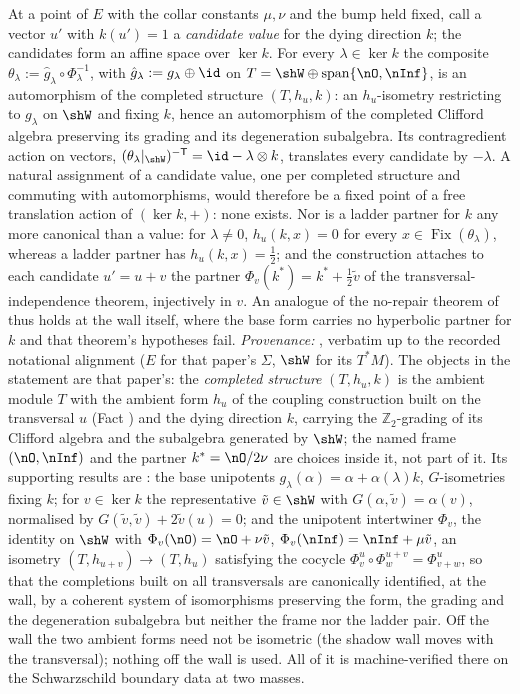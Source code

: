 At a point of $E$ with the collar constants $\mu, \nu$ and the bump held fixed, call a vector $u'$ with $k(u') = 1$ a \emph{candidate value} for the dying direction $k$; the candidates form an affine space over $\ker k$. For every $\lambda \in \ker k$ the composite $\theta_\lambda := \hat g_\lambda \circ \Phi_\lambda^{-1}$, with $\hat g_\lambda := g_\lambda \oplus \id$ on $T = \shW \oplus \operatorname{span}\{\nO, \nInf\}$, is an automorphism of the completed structure $(T, h_u, k)$: an $h_u$-isometry restricting to $g_\lambda$ on $\shW$ and fixing $k$, hence an automorphism of the completed Clifford algebra preserving its grading and its degeneration subalgebra. Its contragredient action on vectors, $(\theta_\lambda|_{\shW})^{-\mathsf{T}} = \id - \lambda \otimes k$, translates every candidate by $-\lambda$. A natural assignment of a candidate value, one per completed structure and commuting with automorphisms, would therefore be a fixed point of a free translation action of $(\ker k, +)$: none exists. Nor is a ladder partner for $k$ any more canonical than a value: for $\lambda \neq 0$, $h_u(k, x) = 0$ for every $x \in \operatorname{Fix}(\theta_\lambda)$, whereas a ladder partner has $h_u(k, x) = \tfrac12$; and the construction attaches to each candidate $u' = u + v$ the partner $\Phi_v(k^*) = k^* + \tfrac12\tilde v$ of the transversal-independence theorem, injectively in $v$. An analogue of the no-repair theorem of \cite[Thm.~4.2]{ButlerT1} thus holds at the wall itself, where the base form carries no hyperbolic partner for $k$ and that theorem's hypotheses fail.
\emph{Provenance:} \cite[Thm.~10.4]{ButlerT4}, verbatim up to the recorded notational alignment ($E$ for that paper's $\Sigma$, $\shW$ for its $T^*M$). The objects in the statement are that paper's: the \emph{completed structure} $(T, h_u, k)$ is the ambient module $T$ with the ambient form $h_u$ of the coupling construction built on the transversal $u$ (Fact ) and the dying direction $k$, carrying the $\mathbb{Z}_2$-grading of its Clifford algebra and the subalgebra generated by $\shW$; the named frame $(\nO, \nInf)$ and the partner $k^* = \nO/2\nu$ are choices inside it, not part of it. Its supporting results are \cite[Lems 10.1, 10.2, Thm.~10.3]{ButlerT4}: the base unipotents $g_\lambda(\alpha) = \alpha + \alpha(\lambda)k$, $G$-isometries fixing $k$; for $v \in \ker k$ the representative $\tilde v \in \shW$ with $G(\alpha, \tilde v) = \alpha(v)$, normalised by $G(\tilde v, \tilde v) + 2\tilde v(u) = 0$; and the unipotent intertwiner $\Phi_v$, the identity on $\shW$ with $\Phi_v(\nO) = \nO + \nu\tilde v$, $\Phi_v(\nInf) = \nInf + \mu\tilde v$, an isometry $(T, h_{u+v}) \to (T, h_u)$ satisfying the cocycle $\Phi^u_v \circ \Phi^{u+v}_w = \Phi^u_{v+w}$, so that the completions built on all transversals are canonically identified, at the wall, by a coherent system of isomorphisms preserving the form, the grading and the degeneration subalgebra but neither the frame nor the ladder pair. Off the wall the two ambient forms need not be isometric (the shadow wall moves with the transversal); nothing off the wall is used. All of it is machine-verified there on the Schwarzschild boundary data at two masses.
